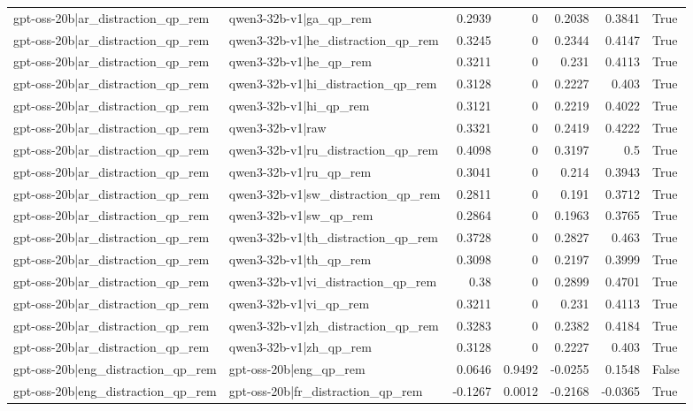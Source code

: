 \begin{table}
\begin{tabular}{l l r r r r l}
gpt-oss-20b|ar_distraction_qp_rem & qwen3-32b-v1|ga_qp_rem & 0.2939 & 0 & 0.2038 & 0.3841 & True \\
gpt-oss-20b|ar_distraction_qp_rem & qwen3-32b-v1|he_distraction_qp_rem & 0.3245 & 0 & 0.2344 & 0.4147 & True \\
gpt-oss-20b|ar_distraction_qp_rem & qwen3-32b-v1|he_qp_rem & 0.3211 & 0 & 0.231 & 0.4113 & True \\
gpt-oss-20b|ar_distraction_qp_rem & qwen3-32b-v1|hi_distraction_qp_rem & 0.3128 & 0 & 0.2227 & 0.403 & True \\
gpt-oss-20b|ar_distraction_qp_rem & qwen3-32b-v1|hi_qp_rem & 0.3121 & 0 & 0.2219 & 0.4022 & True \\
gpt-oss-20b|ar_distraction_qp_rem & qwen3-32b-v1|raw & 0.3321 & 0 & 0.2419 & 0.4222 & True \\
gpt-oss-20b|ar_distraction_qp_rem & qwen3-32b-v1|ru_distraction_qp_rem & 0.4098 & 0 & 0.3197 & 0.5 & True \\
gpt-oss-20b|ar_distraction_qp_rem & qwen3-32b-v1|ru_qp_rem & 0.3041 & 0 & 0.214 & 0.3943 & True \\
gpt-oss-20b|ar_distraction_qp_rem & qwen3-32b-v1|sw_distraction_qp_rem & 0.2811 & 0 & 0.191 & 0.3712 & True \\
gpt-oss-20b|ar_distraction_qp_rem & qwen3-32b-v1|sw_qp_rem & 0.2864 & 0 & 0.1963 & 0.3765 & True \\
gpt-oss-20b|ar_distraction_qp_rem & qwen3-32b-v1|th_distraction_qp_rem & 0.3728 & 0 & 0.2827 & 0.463 & True \\
gpt-oss-20b|ar_distraction_qp_rem & qwen3-32b-v1|th_qp_rem & 0.3098 & 0 & 0.2197 & 0.3999 & True \\
gpt-oss-20b|ar_distraction_qp_rem & qwen3-32b-v1|vi_distraction_qp_rem & 0.38 & 0 & 0.2899 & 0.4701 & True \\
gpt-oss-20b|ar_distraction_qp_rem & qwen3-32b-v1|vi_qp_rem & 0.3211 & 0 & 0.231 & 0.4113 & True \\
gpt-oss-20b|ar_distraction_qp_rem & qwen3-32b-v1|zh_distraction_qp_rem & 0.3283 & 0 & 0.2382 & 0.4184 & True \\
gpt-oss-20b|ar_distraction_qp_rem & qwen3-32b-v1|zh_qp_rem & 0.3128 & 0 & 0.2227 & 0.403 & True \\
gpt-oss-20b|eng_distraction_qp_rem & gpt-oss-20b|eng_qp_rem & 0.0646 & 0.9492 & -0.0255 & 0.1548 & False \\
gpt-oss-20b|eng_distraction_qp_rem & gpt-oss-20b|fr_distraction_qp_rem & -0.1267 & 0.0012 & -0.2168 & -0.0365 & True \\

\end{tabular}
\end{table}
